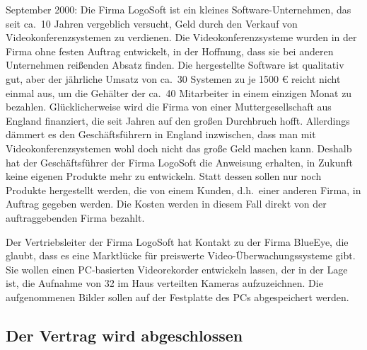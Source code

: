 September 2000: Die Firma LogoSoft ist ein kleines Software-Unternehmen, das
seit ca.\ 10 Jahren vergeblich versucht, Geld durch den Verkauf von
Videokonferenzsystemen zu verdienen. Die Videokonferenzsysteme wurden in der
Firma ohne festen Auftrag entwickelt, in der Hoffnung, dass sie bei anderen
Unternehmen reißenden Absatz finden. Die hergestellte Software ist qualitativ
gut, aber der jährliche Umsatz von ca.\ 30 Systemen zu je 1500 € reicht nicht
einmal aus, um die Gehälter der ca.\ 40 Mitarbeiter in einem einzigen Monat zu
bezahlen. Glücklicherweise wird die Firma von einer Muttergesellschaft aus
England finanziert, die seit Jahren auf den großen Durchbruch hofft. Allerdings
dämmert es den Geschäftsführern in England inzwischen, dass man mit
Videokonferenzsystemen wohl doch nicht das große Geld machen kann. Deshalb hat
der Geschäftsführer der Firma LogoSoft die Anweisung erhalten, in Zukunft keine
eigenen Produkte mehr zu entwickeln. Statt dessen sollen nur noch Produkte
hergestellt werden, die von einem Kunden, d.h.\ einer anderen Firma, in Auftrag
gegeben werden. Die Kosten werden in diesem Fall direkt von der auftraggebenden
Firma bezahlt.

Der Vertriebsleiter der Firma LogoSoft hat Kontakt zu der Firma BlueEye, die
glaubt, dass es eine Marktlücke für preiswerte Video-Überwachungssysteme gibt.
Sie wollen einen PC-basierten Videorekorder entwickeln lassen, der in der Lage
ist, die Aufnahme von 32 im Haus verteilten Kameras aufzuzeichnen. Die
aufgenommenen Bilder sollen auf der Festplatte des PCs abgespeichert werden.

\subsection{Der Vertrag wird abgeschlossen}

